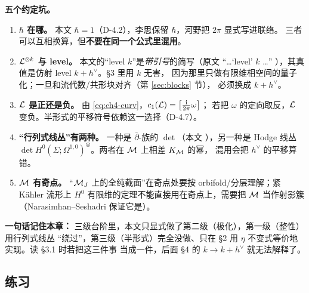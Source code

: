 \begin{keypoint}
\textbf{五个约定坑。}
\begin{enumerate}[leftmargin=1.6em]
\item \textbf{$\hbar$ 在哪。} 本文 $\hbar=1$（D-4.2），李思保留 $\hbar$，河野把 $2\pi$ 显式写进联络。
三者可以互相换算，但\textbf{不要在同一个公式里混用}。
\item \textbf{$\mathcal{L}^{\otimes k}$ 与 level。} 本文的“level $k$”是\emph{带引号}的简写（原文
``\ldots `level' $k$ \ldots'' ），其真值是仿射 level $k+h^\vee$。§3 里用 $k$ 无害，
因为那里只做有限维相空间的量子化；一旦和流代数/共形块对齐（第 \ref{sec:blocks} 节），
必须换成 $k+h^\vee$。
\item \textbf{$\mathcal{L}$ 是正还是负。} 由 \eqref{eq:ch4-curv}，$c_1(\mathcal{L})=\bigl[\frac{\mathrm{i}}{2\pi}\omega\bigr]$；
若把 $\omega$ 的定向取反，$\mathcal{L}$ 变负。半形式的平移符号依赖这一选择（D-4.7）。
\item \textbf{“行列式线丛”有两种。} 一种是 $\bar\partial$-族的 $\det$（本文 ），另一种是
Hodge 线丛 $\det H^0(\Sigma;\Omega^{1,0})^{\otimes}$。两者在 $\mathcal{M}$ 上相差 $K_{\mathcal{M}}$ 的幂，
混用会把 $h^\vee$ 的平移算错。
\item \textbf{$\mathcal{M}$ 有奇点。} “$\mathcal{M}_J$ 上的全纯截面”在奇点处要按 orbifold/分层理解；紧 Kähler 流形上
$H^0$ 有限维的定理不能直接用在奇点上，需要把 $\mathcal{M}$ 当作射影簇（Narasimhan--Seshadri 保证它是）。
\end{enumerate}
\end{keypoint}

\begin{keypoint}
\textbf{一句话记住本章：} 三级台阶里，本文只显式做了第二级（极化），第一级（整性）用行列式线丛
“绕过”，第三级（半形式）完全没做、只在 §2 用 $\eta$ 不变式等价地实现。读 §3.1 时若把这三件事
当成一件，后面 §4 的 $k\to k+h^\vee$ 就无法解释了。
\end{keypoint}

\subsection{练习}

